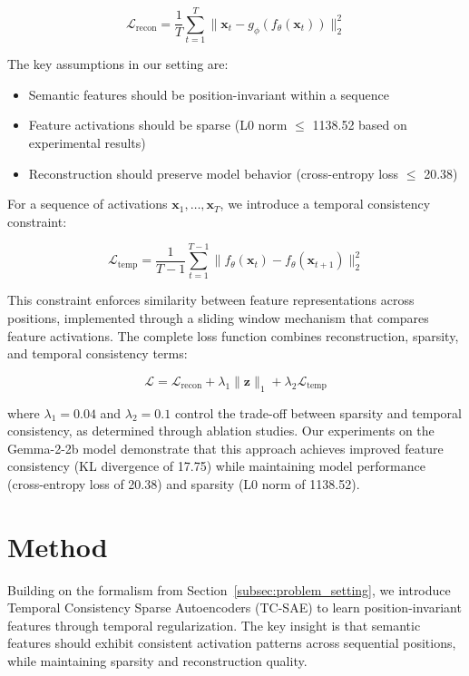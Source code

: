 \documentclass{article} %
\begin{document}
\begin{equation}
\mathcal{L}_{\text{recon}} = \frac{1}{T}\sum_{t=1}^T \|\mathbf{x}_t - g_\phi(f_\theta(\mathbf{x}_t))\|_2^2
\end{equation}

The key assumptions in our setting are:
\begin{itemize}
    \item Semantic features should be position-invariant within a sequence
    \item Feature activations should be sparse (L0 norm $\leq$ 1138.52 based on experimental results)
    \item Reconstruction should preserve model behavior (cross-entropy loss $\leq$ 20.38)
\end{itemize}

For a sequence of activations $\mathbf{x}_1, \ldots, \mathbf{x}_T$, we introduce a temporal consistency constraint:

\begin{equation}
\mathcal{L}_{\text{temp}} = \frac{1}{T-1}\sum_{t=1}^{T-1}\|f_\theta(\mathbf{x}_t) - f_\theta(\mathbf{x}_{t+1})\|_2^2
\end{equation}

This constraint enforces similarity between feature representations across positions, implemented through a sliding window mechanism that compares feature activations. The complete loss function combines reconstruction, sparsity, and temporal consistency terms:

\begin{equation}
\mathcal{L} = \mathcal{L}_{\text{recon}} + \lambda_1\|\mathbf{z}\|_1 + \lambda_2\mathcal{L}_{\text{temp}}
\end{equation}

where $\lambda_1 = 0.04$ and $\lambda_2 = 0.1$ control the trade-off between sparsity and temporal consistency, as determined through ablation studies. Our experiments on the Gemma-2-2b model demonstrate that this approach achieves improved feature consistency (KL divergence of 17.75) while maintaining model performance (cross-entropy loss of 20.38) and sparsity (L0 norm of 1138.52).

\section{Method}
\label{sec:method}

Building on the formalism from Section~\ref{subsec:problem_setting}, we introduce Temporal Consistency Sparse Autoencoders (TC-SAE) to learn position-invariant features through temporal regularization. The key insight is that semantic features should exhibit consistent activation patterns across sequential positions, while maintaining sparsity and reconstruction quality.
\end{document}
